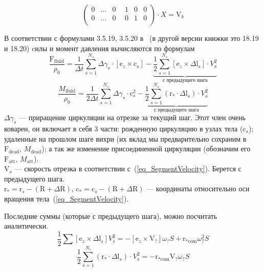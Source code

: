 \documentclass[14pt]{extreport}
\newcommand{\br}[1]{\boldsymbol{\mathrm{#1}}}
\renewcommand{\vec}[1]{\br{#1}}
\newcommand{\att}{\text{att}}
\begin{document}
\begin{equation*}
\begin{pmatrix}
0& \dotsc& 0& ~~1& 0& 0\\
0& \dotsc& 0& ~~0& 1& 0\\
\end{pmatrix}
\cdot X = \vec V_b
\end{equation*}

В соответствии с формулами 3.5.19, 3.5.20 в~\cite{vvd_book} (в другой версии книжки это 18.19 и 18.20) cилы и момент давления вычисляются по формулам
\begin{equation}
\label{eq_force}
\dfrac{\vec F_\text{fluid}}{\rho_0} = 
\frac{1}{\Delta t} \sum\limits_{s=1}^{N_s} {\Delta \gamma_s \cdot [\vec e_z \times \vec c_s]} -
\underbrace {
	\frac{1}{2} \sum\limits_{s=1}^{N_s}
		[\vec e_z \times \Delta \vec l_s] \cdot V_s^2
}_{\text{с предыдущего шага}}
\end{equation}
%
\begin{equation}
\label{eq_moment}
\dfrac{M_\text{fluid}}{\rho_0} =
\frac{1}{2\Delta t}\sum\limits_{s=1}^{N_s} { \Delta \gamma_s \cdot \vec c_*^2 }
-
\underbrace {
	\frac{1}{2} \sum\limits_{s=1}^{N_s}
		(\vec r_* \cdot \Delta \vec l_s) \cdot V_s^2
}_{\text{с предыдущего шага}}
\end{equation}
%
$\Delta \gamma_s$ --- приращение циркуляции на отрезке за текущий шаг. Этот член очень коварен, он включает в себя 3 части: рожденную циркуляцию в узлах тела ($\vec c_s$); удаленные на прошлом шаге вихри (их вклад мы предварительно сохраним в $\vec F_\text{dead}$, $M_\text{dead}$); а так же изменение присоединенной циркуляции (обозначим его $\vec F_\att$, $M_\att$).\\
$\vec V_s$ --- скорость отрезка в соответствии с~(\ref{eq_SegmentVelocity}). Берется с предыдущего шага.\\
$\vec r_* = \vec r_s - (\vec R + \Delta \vec R)$, $\vec c_* = \vec c_s - (\vec R + \Delta \vec R)$ --- координаты относительно оси вращения тела~(\ref{eq_SegmentVelocity}).

Последние суммы (которые с предыдущего шага), можно посчитать аналитически.
\begin{equation*}
\dfrac{1}{2} \sum [\vec e_z \times \Delta \vec l_s] V_s^2 = - [\vec e_z \times \vec V_?]\omega_? S + \vec r_{*\text{com}} \omega_?^2 S
\end{equation*}
\begin{equation*}
\frac{1}{2} \sum\limits_{s=1}^{N_s} (\vec r_* \cdot \Delta \vec l_s) \cdot V_s^2
=
- \vec r_{*\text{com}} \vec V_? \omega_? S
\end{equation*}
\end{document}
